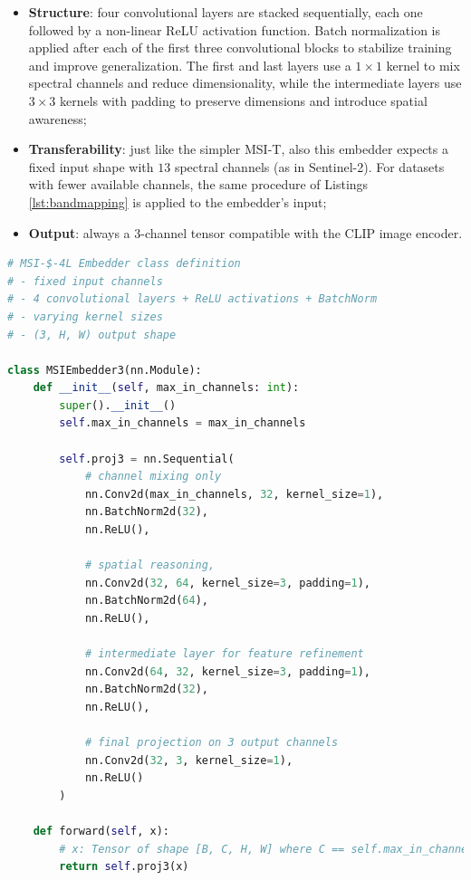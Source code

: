 \documentclass[a4paper, oneside, english]{sapthesis} %
\begin{document}
\begin{itemize}
    \item \textbf{Structure}: four convolutional layers are stacked sequentially, each one followed by a non-linear ReLU activation function. Batch normalization is applied after each of the first three convolutional blocks to stabilize training and improve generalization. The first and last layers use a $1\times1$ kernel to mix spectral channels and reduce dimensionality, while the intermediate layers use $3\times3$ kernels with padding to preserve dimensions and introduce spatial awareness;
    \item \textbf{Transferability}: just like the simpler MSI-T, also this embedder expects a fixed input shape with $13$ spectral channels (as in Sentinel-2). For datasets with fewer available channels, the same procedure of Listings \ref{lst:bandmapping} is applied to the embedder's input;
    \item \textbf{Output}: always a $3$-channel tensor compatible with the CLIP image encoder.
\end{itemize}

\vspace{-0.3cm}

\begin{lstlisting}[language=Python, caption={MSI-T-4L Embedder structure in PyTorch code.}]
# MSI-$-4L Embedder class definition
# - fixed input channels
# - 4 convolutional layers + ReLU activations + BatchNorm
# - varying kernel sizes
# - (3, H, W) output shape

class MSIEmbedder3(nn.Module):
    def __init__(self, max_in_channels: int):
        super().__init__()
        self.max_in_channels = max_in_channels

        self.proj3 = nn.Sequential(
            # channel mixing only
            nn.Conv2d(max_in_channels, 32, kernel_size=1),  
            nn.BatchNorm2d(32),
            nn.ReLU(),
            
            # spatial reasoning,
            nn.Conv2d(32, 64, kernel_size=3, padding=1),
            nn.BatchNorm2d(64),
            nn.ReLU(),
            
            # intermediate layer for feature refinement
            nn.Conv2d(64, 32, kernel_size=3, padding=1), 
            nn.BatchNorm2d(32),
            nn.ReLU(),

            # final projection on 3 output channels
            nn.Conv2d(32, 3, kernel_size=1),                
            nn.ReLU()
        )

    def forward(self, x):
        # x: Tensor of shape [B, C, H, W] where C == self.max_in_channels
        return self.proj3(x)
\end{lstlisting}
\end{document}

